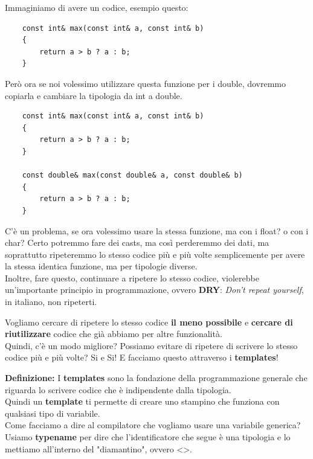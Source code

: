 \textsf{\small Immaginiamo di avere un codice, esempio questo:} \\

\begin{lstlisting}
	const int& max(const int& a, const int& b)
	{
		return a > b ? a : b;
	}
\end{lstlisting}

\textsf{\small Però ora se noi volessimo utilizzare questa funzione per i double, dovremmo copiarla e cambiare la tipologia da int a double.} \\

\begin{lstlisting}
	const int& max(const int& a, const int& b)
	{
		return a > b ? a : b;
	}

	const double& max(const double& a, const double& b)
	{
		return a > b ? a : b;
	}
\end{lstlisting}

\textsf{\small C'è un problema, se ora volessimo usare la stessa funzione, ma con i float? o con i char? Certo potremmo fare dei casts, ma così perderemmo dei dati, ma soprattutto ripeteremmo lo stesso codice più e più volte semplicemente per avere la stessa identica funzione, ma per tipologie diverse.} \\

\textsf{\small Inoltre, fare questo, continuare a ripetere lo stesso codice, violerebbe un'importante principio in programmazione, ovvero \textbf{DRY}: \emph{Don't repeat yourself}, in italiano, non ripeterti.} \break 

\textsf{\small Vogliamo cercare di ripetere lo stesso codice \textbf{il meno possibile} e \textbf{cercare di riutilizzare} codice che già abbiamo per altre funzionalità.} \\

\textsf{\small Quindi, c'è un modo migliore? Possiamo evitare di ripetere di scrivere lo stesso codice più e più volte? Si e Si! E facciamo questo attraverso i \textbf{templates}!} \break

\textsf{\small \textbf{Definizione:} I \textbf{templates} sono la fondazione della programmazione generale che riguarda lo scrivere codice che è indipendente dalla tipologia. } \\

\textsf{\small Quindi un \textbf{template} ti permette di creare uno stampino che funziona con qualsiasi tipo di variabile.} \\

\textsf{\small Come facciamo a dire al compilatore che vogliamo usare una variabile generica? Usiamo \textbf{typename} per dire che l'identificatore che segue è una tipologia e lo mettiamo all'interno del "diamantino", ovvero <>.} \\

